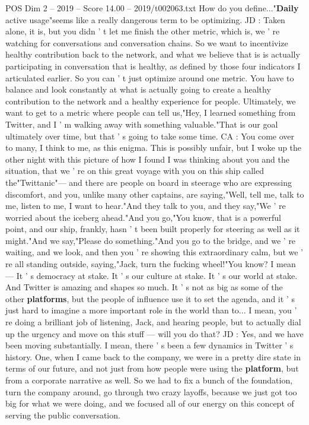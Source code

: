\begin{textsample}{POS Dim 2 – 2019 – Score 14.00 – 2019/t002063.txt}
How do you define..."\textbf{Daily} active usage"seems like a really dangerous term to be optimizing.
JD : Taken alone, it is, but you didn ' t let me finish the other metric, which is, we ' re watching for conversations and conversation chains.
So we want to incentivize healthy contribution back to the network, and what we believe that is is actually participating in conversation that is healthy, as defined by those four indicators I articulated earlier.
So you can ' t just optimize around one metric.
You have to balance and look constantly at what is actually going to create a healthy contribution to the network and a healthy experience for people.
Ultimately, we want to get to a metric where people can tell us,"Hey, I learned something from Twitter, and I ' m walking away with something valuable."That is our goal ultimately over time, but that ' s going to take some time.
CA : You come over to many, I think to me, as this enigma.
This is possibly unfair, but I woke up the other night with this picture of how I found I was thinking about you and the situation, that we ' re on this great voyage with you on this ship called the"Twittanic"— and there are people on board in steerage who are expressing discomfort, and you, unlike many other captains, are saying,"Well, tell me, talk to me, listen to me, I want to hear."And they talk to you, and they say,"We ' re worried about the iceberg ahead."And you go,"You know, that is a powerful point, and our ship, frankly, hasn ' t been built properly for steering as well as it might."And we say,"Please do something."And you go to the bridge, and we ' re waiting, and we look, and then you ' re showing this extraordinary calm, but we ' re all standing outside, saying,"Jack, turn the fucking wheel!"You know?
I mean — It ' s democracy at stake.
It ' s our culture at stake.
It ' s our world at stake.
And Twitter is amazing and shapes so much.
It ' s not as big as some of the other \textbf{platforms}, but the people of influence use it to set the agenda, and it ' s just hard to imagine a more important role in the world than to...
I mean, you ' re doing a brilliant job of listening, Jack, and hearing people, but to actually dial up the urgency and move on this stuff — will you do that?
JD : Yes, and we have been moving substantially.
I mean, there ' s been a few dynamics in Twitter ' s history.
One, when I came back to the company, we were in a pretty dire state in terms of our future, and not just from how people were using the \textbf{platform}, but from a corporate narrative as well.
So we had to fix a bunch of the foundation, turn the company around, go through two crazy layoffs, because we just got too big for what we were doing, and we focused all of our energy on this concept of serving the public conversation.

\end{textsample}
